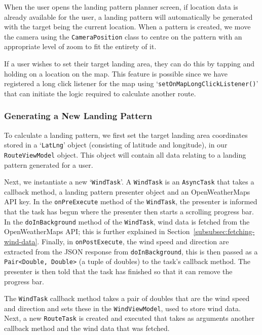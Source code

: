When the user opens the landing pattern planner screen, if location data is already available for the user, a landing pattern will automatically be generated with the target being the current location. When a pattern is created, we move the camera using the \texttt{CameraPosition} class to centre on the pattern with an appropriate level of zoom to fit the entirety of it.

If a user wishes to set their target landing area, they can do this by tapping and holding on a location on the map. This feature is possible since we have registered a long click listener for the map using `\texttt{setOnMapLongClickListener()}' that can initiate the logic required to calculate another route.

\subsubsection{Generating a New Landing Pattern}
To calculate a landing pattern, we first set the target landing area coordinates stored in a `\texttt{LatLng}' object (consisting of latitude and longitude), in our \texttt{RouteViewModel} object. This object will contain all data relating to a landing pattern generated for a user.

Next, we instantiate a new `\texttt{WindTask}'. A \texttt{WindTask} is an \texttt{AsyncTask} that takes a callback method, a landing pattern presenter object and an OpenWeatherMaps API key. In the \texttt{onPreExecute} method of the \texttt{WindTask}, the presenter is informed that the task has begun where the presenter then starts a scrolling progress bar. In the \texttt{doInBackground} method of the \texttt{WindTask}, wind data is fetched from the OpenWeatherMaps API; this is further explained in Section~\vref{subsubsec:fetching-wind-data}. Finally, in \texttt{onPostExecute}, the wind speed and direction are extracted from the JSON response from \texttt{doInBackground}, this is then passed as a \texttt{Pair<Double, Double>} (a tuple of doubles) to the task's callback method. The presenter is then told that the task has finished so that it can remove the progress bar.

The \texttt{WindTask} callback method takes a pair of doubles that are the wind speed and direction and sets these in the \texttt{WindViewModel}, used to store wind data. Next, a new \texttt{RouteTask} is created and executed that takes as arguments another callback method and the wind data that was fetched.

